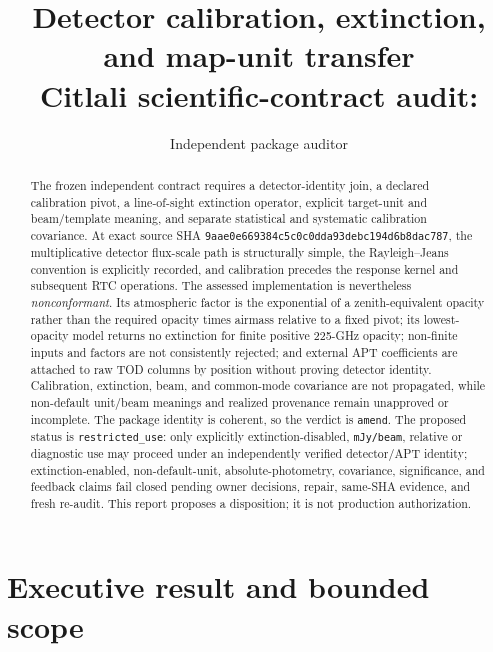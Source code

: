 \documentclass[11pt]{article}
\title{Detector calibration, extinction, and map-unit transfer\\
\large Citlali scientific-contract audit: \PackageID}
\author{Independent package auditor}
\date{\AuditDate}
\newcommand{\code}[1]{\nolinkurl{#1}}
\newcommand{\gitsha}[5]{\texttt{#1\allowbreak#2\allowbreak#3\allowbreak#4\allowbreak#5}}
\newcommand{\GoverningSHA}{\gitsha{9aae0e66}{9384c5c0}{c0dda93d}{ebc194d6}{b8dac787}}
\begin{document}
\maketitle

\begin{abstract}
The frozen independent contract requires a detector-identity join, a declared
calibration pivot, a line-of-sight extinction operator, explicit target-unit
and beam/template meaning, and separate statistical and systematic
calibration covariance.  At exact source SHA \GoverningSHA, the multiplicative
detector flux-scale path is structurally simple, the Rayleigh--Jeans convention
is explicitly recorded, and calibration precedes the response kernel and
subsequent RTC operations.  The assessed implementation is nevertheless
\emph{nonconformant}.  Its atmospheric factor is the exponential of a
zenith-equivalent opacity rather than the required opacity times airmass
relative to a fixed pivot; its lowest-opacity model returns no extinction for
finite positive 225-GHz opacity; non-finite inputs and factors are not
consistently rejected; and external APT coefficients are attached to raw TOD
columns by position without proving detector identity.  Calibration,
extinction, beam, and common-mode covariance are not propagated, while
non-default unit/beam meanings and realized provenance remain unapproved or
incomplete.  The package identity is coherent, so the verdict is
\code{amend}.  The proposed status is \code{restricted_use}: only explicitly
extinction-disabled, \code{mJy/beam}, relative or diagnostic use may proceed
under an independently verified detector/APT identity; extinction-enabled,
non-default-unit, absolute-photometry, covariance, significance, and feedback
claims fail closed pending owner decisions, repair, same-SHA evidence, and
fresh re-audit.  This report proposes a disposition; it is not production
authorization.
\end{abstract}

\section{Executive result and bounded scope}
\end{document}
